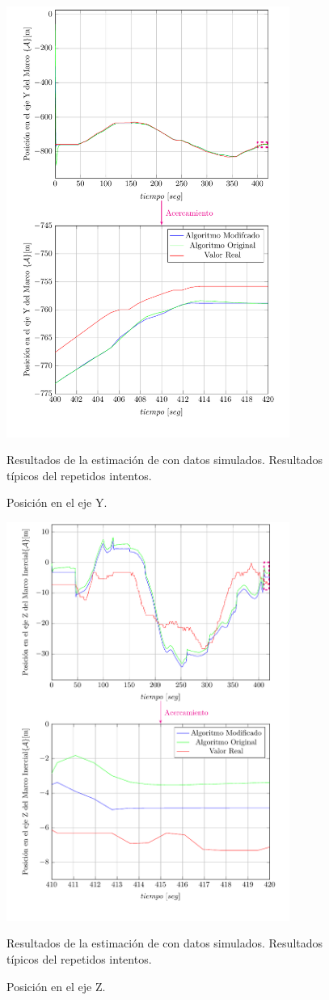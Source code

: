 \documentclass[conference]{IEEEtran}
\begin{document}
\begin{figure}
\begin{center}
\includegraphics[width=25em]
{PlotY4b.pdf}
\caption{Posición en el eje Y.}
\scriptsize{Resultados de la estimación de con datos simulados. Resultados típicos del repetidos intentos.}
\label{PlotY1}
\end{center}
\end{figure}
\begin{figure}
\begin{center}
\includegraphics[width=25em]
{PlotZ4b.pdf}
\caption{Posición en el eje Z.}
\scriptsize{Resultados de la estimación de con datos simulados. Resultados típicos del repetidos intentos.}
\label{PlotZ1}
\end{center}
\end{figure}
\end{document}
